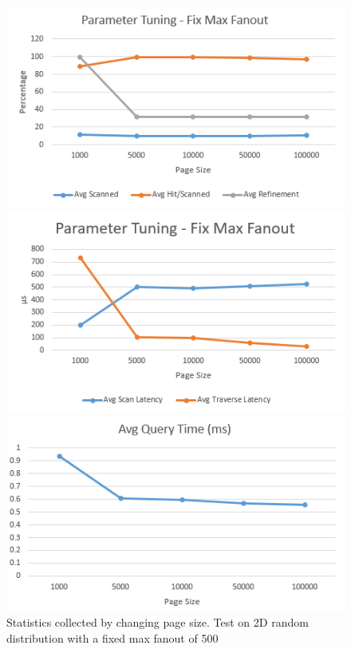 \documentclass[sigconf,10pt]{acmart}
\begin{document}
\begin{figure}[ht] 
  \label{parameter-fix-fanout} 
  \begin{minipage}[b]{0.33\linewidth}
    \centering
    \includegraphics[width=.8\linewidth]{../figures/parameter/fix-fanout-hit} 
    \vspace{4ex}
  \end{minipage}%
  \begin{minipage}[b]{0.33\linewidth}
    \centering
    \includegraphics[width=.8\linewidth]{../figures/parameter/fix-fanout-latency} 
    \vspace{4ex}
  \end{minipage}%
  \begin{minipage}[b]{0.33\linewidth}
    \centering
    \includegraphics[width=.8\linewidth]{../figures/parameter/fix-fanout-qtime} 
    \vspace{4ex}
  \end{minipage}
  \caption{Statistics collected by changing page size. Test on 2D random distribution
  with a fixed max fanout of 500}
\end{figure}
\end{document}
